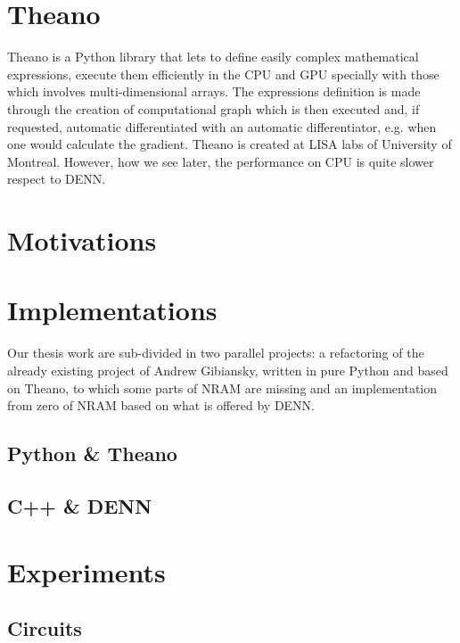 \section{Theano}
Theano is a Python library that lets to define easily complex mathematical expressions, execute them efficiently in the CPU and GPU specially with those which involves multi-dimensional arrays. The expressions definition is made through the creation of computational graph which is then executed and, if requested, automatic differentiated with an automatic differentiator, e.g. when one would calculate the gradient. Theano is created at LISA labs of University of Montreal. However, how we see later, the performance on CPU is quite slower respect to DENN.
\section{Motivations}

\section{Implementations}
Our thesis work are sub-divided in two parallel projects: a refactoring of the already existing project of Andrew Gibiansky, written in pure Python and based on Theano, to which some parts of NRAM are missing and an implementation from zero of NRAM based on what is offered by DENN.

\subsection{Python \&{} Theano}

\subsection{C++ \&{} DENN}

\section{Experiments}

\subsection{Circuits}